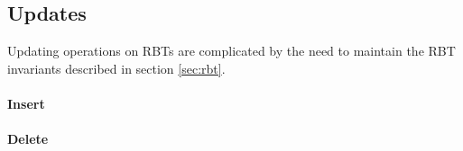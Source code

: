 \documentclass[a4paper, 12pt]{article}
\begin{document}
\subsection{Updates}

Updating operations on RBTs are complicated by the need to maintain
the RBT invariants described in section \ref{sec:rbt}.

\paragraph{Insert}

\paragraph{Delete}
\end{document}
